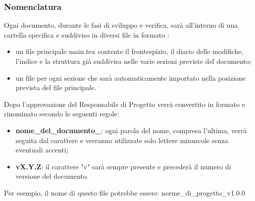 	\subsubsection{Nomenclatura}
	Ogni documento, durante le fasi di sviluppo e verifica, sarà all'interno di una cartella specifica e suddiviso in diversi file in formato \glock{\LaTeX}:
	\begin{itemize}
		\item un file principale main.tex contente il frontespizio, il diario delle modifiche, l'indice e la struttura già suddivisa nelle varie sezioni previste del documento;
		\item un file per ogni sezione che sarà automaticamente importato nella posizione prevista del file principale.
	\end{itemize}
	Dopo l'approvazione del Responsabile di Progetto verrà convertito in formato  e rinominato secondo le seguenti regole:
	\begin{itemize}
		\item \textbf{nome\_del\_documento\_}: ogni parola del nome, compresa l'ultima, verrà seguita dal carattere  e verranno utilizzate solo lettere minuscole senza eventuali accenti;
		\item \textbf{vX.Y.Z}: il carattere "v" sarà sempre presente e precederà il numero di versione del documento.
	\end{itemize}
	Per esempio, il nome di questo file potrebbe essere: norme\_di\_progetto\_v1.0.0\\

